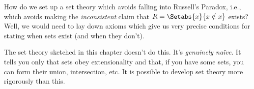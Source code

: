 \documentclass[../../../include/open-logic-section]{subfiles}
\begin{document}
\begin{digress}
How do we set up a set theory which avoids falling into
Russell's Paradox, i.e., which avoids making the \emph{inconsistent}
claim that $R = \Setabs{x}{x \notin x}$ exists? Well, we would need to
lay down axioms which give us very precise conditions for stating when
sets exist (and when they don't). 
	
The set theory sketched in this chapter doesn't do this. It's
\emph{genuinely na\"ive}. It tells you only that sets obey
extensionality and that, if you have some sets, you can form their
union, intersection, etc. It is possible to develop set theory more
rigorously than this. 
\end{digress}
\end{document}
